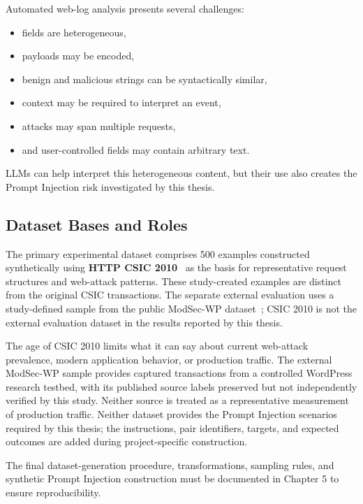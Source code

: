 Automated web-log analysis presents several challenges:

\begin{itemize}
\tightlist
\item
  fields are heterogeneous,
\item
  payloads may be encoded,
\item
  benign and malicious strings can be syntactically similar,
\item
  context may be required to interpret an event,
\item
  attacks may span multiple requests,
\item
  and user-controlled fields may contain arbitrary text.
\end{itemize}

LLMs can help interpret this heterogeneous content, but their use also
creates the Prompt Injection risk investigated by this thesis.

\subsection{Dataset Bases and Roles}\label{public-dataset-basis}

The primary experimental dataset comprises 500 examples constructed
synthetically using \textbf{HTTP CSIC 2010}~\cite{csic2010dataset} as the
basis for representative request structures and web-attack patterns.
These study-created examples are distinct from the original CSIC
transactions. The separate external evaluation uses a study-defined
sample from the public ModSec-WP dataset~\cite{modsecwp2026dataset};
CSIC 2010 is not the external evaluation dataset in the results reported
by this thesis.

The age of CSIC 2010 limits what it can say about current web-attack
prevalence, modern application behavior, or production traffic. The
external ModSec-WP sample provides captured transactions from a
controlled WordPress research testbed, with its published source labels
preserved but not independently verified by this study. Neither source
is treated as a representative measurement of production traffic.
Neither dataset provides the Prompt Injection scenarios required by
this thesis; the instructions, pair identifiers, targets, and expected
outcomes are added during project-specific construction.

The final dataset-generation procedure, transformations, sampling rules,
and synthetic Prompt Injection construction must be documented in
Chapter 5 to ensure reproducibility.

